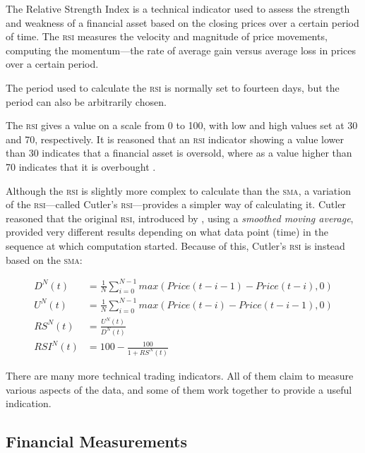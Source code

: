 \begin{multicols}{2}
The Relative Strength Index is a technical indicator used to assess the strength
and weakness of a financial asset based on the closing prices over a certain
period of time.  The \textsc{rsi} measures the velocity and magnitude of price
movements, computing the momentum---the rate of average gain versus average loss
in prices over a certain period.

The period used to calculate the \textsc{rsi} is normally set to fourteen days,
but the period can also be arbitrarily chosen.

The \textsc{rsi} gives a value on a scale from 0 to 100, with low and high
values set at 30 and 70, respectively. It is reasoned that an \textsc{rsi}
indicator showing a value lower than 30 indicates that a financial asset is
oversold, where as a value higher than 70 indicates that it is overbought
\citep{wilder1978}.

Although the \textsc{rsi} is slightly more complex to calculate than the
\textsc{sma}, a variation of the \textsc{rsi}---called Cutler's
\textsc{rsi}---provides a simpler way of calculating it.  Cutler reasoned that
the original \textsc{rsi}, introduced by \citet{wilder1978}, using a
\textit{smoothed moving average}, provided very different results depending on
what data point (time) in the sequence at which computation started.  Because of
this, Cutler's \textsc{rsi} is instead based on the \textsc{sma}:\@

\begin{Figure}
  \begin{align*}
    D^N(t) & = \frac{1}{N}\sum\limits_{i=0}^{N-1} max(\mathit{Price(t-i-1)} -
                                                     \mathit{Price(t-i)}, 0) \\
    U^N(t) & = \frac{1}{N}\sum\limits_{i=0}^{N-1} max(\mathit{Price(t-i)} -
                                                     \mathit{Price(t-i-1)}, 0) \\
    \mathit{RS^N}(t) & = \frac{U^N(t)}{D^N(t)} \\
    \mathit{RSI^N}(t) & = 100 - \frac{100}{1 + \mathit{RS^N}(t)}
  \end{align*}
\end{Figure}

\noindent There are many more technical trading indicators.  All of them claim
to measure various aspects of the data, and some of them work together to
provide a useful indication.

\subsection{Financial Measurements}


\end{multicols}
